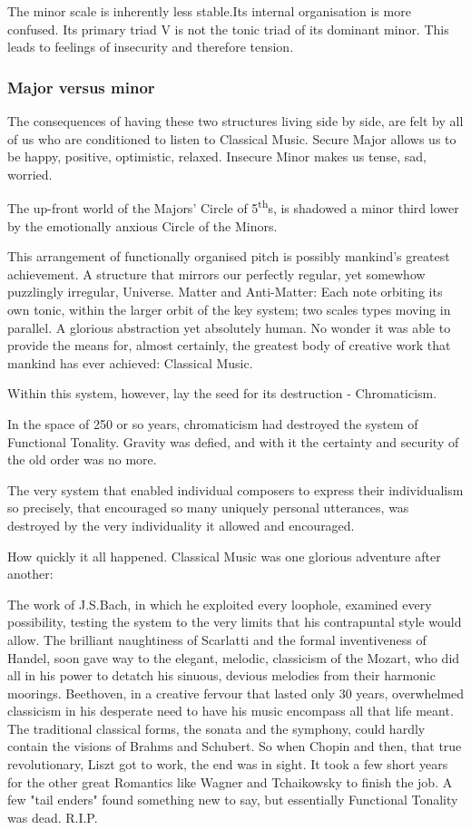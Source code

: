 \documentclass{article}
\begin{document}
The minor scale is inherently less stable.Its internal organisation is more confused.
Its primary triad V is not the tonic triad of its dominant minor.
This leads to feelings of insecurity and therefore tension.

\subsubsection{Major versus minor}

The consequences of having these two structures living side by side, are felt by all of us who are conditioned to listen to Classical Music.
Secure Major allows us to be happy, positive, optimistic, relaxed.
Insecure Minor makes us tense, sad, worried.

The up-front world of the Majors' Circle of 5\textsuperscript{th}s, is shadowed a minor third lower by the emotionally anxious Circle of the Minors.

This arrangement of functionally organised pitch is possibly mankind's greatest achievement.
A structure that mirrors our perfectly regular, yet somewhow puzzlingly irregular, Universe.
Matter and Anti-Matter: Each note orbiting its own tonic, within the larger orbit of the key system; two scales types moving in parallel.
A glorious abstraction yet absolutely human.
No wonder it was able to provide the means for, almost certainly, the greatest body of creative work that mankind has ever achieved: Classical Music.

Within this system, however, lay the seed for its destruction - Chromaticism.

In the space of 250 or so years, chromaticism had destroyed the system of Functional Tonality.
Gravity was defied, and with it the certainty and security of the old order was no more.

The very system that enabled individual composers to express their individualism so precisely, that encouraged so many uniquely personal utterances, was destroyed by the very individuality it allowed and encouraged.

How quickly it all happened.
Classical Music was one glorious adventure after another:

The work of J.S.Bach, in which he exploited every loophole, examined every possibility, testing the system to the very limits that his contrapuntal style would allow.
The brilliant naughtiness of Scarlatti and the formal inventiveness of Handel, soon gave way to the elegant, melodic, classicism of the Mozart, who did all in his power to detatch his sinuous, devious melodies from their harmonic moorings.
Beethoven, in a creative fervour that lasted only 30 years, overwhelmed classicism in his desperate need to have his music encompass all that life meant.
The  traditional classical forms, the sonata and the symphony, could hardly contain the visions of Brahms and Schubert.
So when Chopin and then, that true revolutionary, Liszt got to work, the end was in sight.
It took a few short years for the other great Romantics like Wagner and Tchaikowsky to finish the job.
A few "tail enders" found something new to say, but essentially Functional Tonality was dead.
R.I.P.
\end{document}

